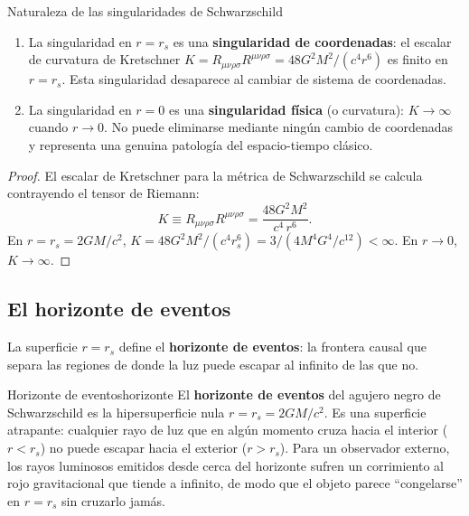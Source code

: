 \begin{proposicion}{Naturaleza de las singularidades de Schwarzschild}{}
\begin{enumerate}[leftmargin=2em, label=(\alph*)]
  \item La singularidad en $r = r_s$ es una \textbf{singularidad de coordenadas}: el escalar de curvatura de Kretschner $K = R_{\mu\nu\rho\sigma}R^{\mu\nu\rho\sigma} = 48G^2M^2/(c^4 r^6)$ es finito en $r = r_s$. Esta singularidad desaparece al cambiar de sistema de coordenadas.
  \item La singularidad en $r = 0$ es una \textbf{singularidad física} (o curvatura): $K \to \infty$ cuando $r \to 0$. No puede eliminarse mediante ningún cambio de coordenadas y representa una genuina patología del espacio-tiempo clásico.
\end{enumerate}
\end{proposicion}

\begin{proof}
El escalar de Kretschner para la métrica de Schwarzschild se calcula contrayendo el tensor de Riemann:
\begin{equation}
  K \equiv R_{\mu\nu\rho\sigma}R^{\mu\nu\rho\sigma} = \frac{48G^2M^2}{c^4\,r^6}.
  \label{eq:kretschner}
\end{equation}
En $r = r_s = 2GM/c^2$, $K = 48G^2M^2/(c^4 r_s^6) = 3/(4M^4 G^4/c^{12}) < \infty$. En $r \to 0$, $K \to \infty$.
\end{proof}

\subsection{El horizonte de eventos}

La superficie $r = r_s$ define el \textbf{horizonte de eventos}: la frontera causal que separa las regiones de donde la luz puede escapar al infinito de las que no.

\begin{definicion}{Horizonte de eventos}{horizonte}
El \textbf{horizonte de eventos} del agujero negro de Schwarzschild es la hipersuperficie nula $r = r_s = 2GM/c^2$. Es una superficie atrapante: cualquier rayo de luz que en algún momento cruza hacia el interior ($r < r_s$) no puede escapar hacia el exterior ($r > r_s$). Para un observador externo, los rayos luminosos emitidos desde cerca del horizonte sufren un corrimiento al rojo gravitacional que tiende a infinito, de modo que el objeto parece ``congelarse'' en $r = r_s$ sin cruzarlo jamás.
\end{definicion}

